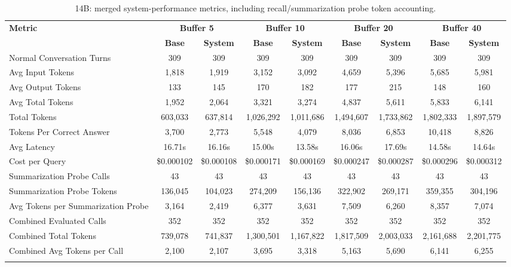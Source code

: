 \begin{table}[htbp]
\caption{14B: merged system-performance metrics, including recall/summarization probe token accounting.}\label{tab:14b_perf_main}
\centering
\tiny
\setlength{\tabcolsep}{2.2pt}
\begin{adjustbox}{width=\textwidth}
\begin{tabular}{lcccccccc}
\toprule
\textbf{Metric} & \multicolumn{2}{c}{\textbf{Buffer 5}} & \multicolumn{2}{c}{\textbf{Buffer 10}} & \multicolumn{2}{c}{\textbf{Buffer 20}} & \multicolumn{2}{c}{\textbf{Buffer 40}} \\
\cmidrule(lr){2-3}\cmidrule(lr){4-5}\cmidrule(lr){6-7}\cmidrule(lr){8-9}
 & \textbf{Base} & \textbf{System} & \textbf{Base} & \textbf{System} & \textbf{Base} & \textbf{System} & \textbf{Base} & \textbf{System} \\
\midrule
Normal Conversation Turns & 309 & 309 & 309 & 309 & 309 & 309 & 309 & 309 \\
Avg Input Tokens & 1,818 & 1,919 & 3,152 & 3,092 & 4,659 & 5,396 & 5,685 & 5,981 \\
Avg Output Tokens & 133 & 145 & 170 & 182 & 177 & 215 & 148 & 160 \\
Avg Total Tokens & 1,952 & 2,064 & 3,321 & 3,274 & 4,837 & 5,611 & 5,833 & 6,141 \\
Total Tokens & 603,033 & 637,814 & 1,026,292 & 1,011,686 & 1,494,607 & 1,733,862 & 1,802,333 & 1,897,579 \\
Tokens Per Correct Answer & 3,700 & 2,773 & 5,548 & 4,079 & 8,036 & 6,853 & 10,418 & 8,826 \\
Avg Latency & 16.71s & 16.16s & 15.00s & 13.58s & 16.06s & 17.69s & 14.58s & 14.64s \\
Cost per Query & \$0.000102 & \$0.000108 & \$0.000171 & \$0.000169 & \$0.000247 & \$0.000287 & \$0.000296 & \$0.000312 \\
Summarization Probe Calls & 43 & 43 & 43 & 43 & 43 & 43 & 43 & 43 \\
Summarization Probe Tokens & 136,045 & 104,023 & 274,209 & 156,136 & 322,902 & 269,171 & 359,355 & 304,196 \\
Avg Tokens per Summarization Probe & 3,164 & 2,419 & 6,377 & 3,631 & 7,509 & 6,260 & 8,357 & 7,074 \\
Combined Evaluated Calls & 352 & 352 & 352 & 352 & 352 & 352 & 352 & 352 \\
Combined Total Tokens & 739,078 & 741,837 & 1,300,501 & 1,167,822 & 1,817,509 & 2,003,033 & 2,161,688 & 2,201,775 \\
Combined Avg Tokens per Call & 2,100 & 2,107 & 3,695 & 3,318 & 5,163 & 5,690 & 6,141 & 6,255 \\
\botrule
\end{tabular}
\end{adjustbox}
\end{table}

